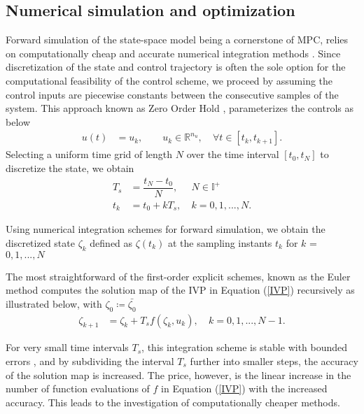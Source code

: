 \subsection{Numerical simulation and optimization}
Forward simulation of the state-space model being a cornerstone of \ac{MPC}, relies on computationally cheap and accurate numerical integration methods \cite[p. 7]{gros_numerical_2022}. Since discretization of the state and control trajectory is often the sole option for the computational feasibility of the control scheme, we proceed by assuming the control inputs are piecewise constants between the consecutive samples of the system. This approach known as Zero Order Hold \cite{gros_numerical_2022}, parameterizes the controls as below
\begin{align}
    u(t) &= u_{k}, \qquad u_{k} \in \mathbb{R}^{n_u},&~\forall t \in [t_{k}, t_{k+1}].\label{ZeroOrder}
\end{align}
Selecting a uniform time grid of length $N$ over the time interval $[t_{0}, t_{N}]$ to discretize the state, we obtain
\begin{align}
    T_s &= \dfrac{t_{N}-t_0}{N}, & ~ N \in \mathbb{I}^+\\
    t_k &= t_0 + kT_s, &  ~ k = 0, 1, ..., N.
\end{align}
\par Using numerical integration schemes for forward simulation, we obtain the discretized state $\zeta_{k}$ defined as $\zeta(t_{k})$ at the sampling instants $t_{k}$ for $k$ = $0, 1, ..., N$ 

\par The most straightforward of the first-order explicit schemes, known as the Euler method computes the solution map of the \ac{IVP} in Equation (\ref{IVP}) recursively as illustrated below, with $\zeta_{0} \coloneq \bar{\zeta_{0}}$
\begin{align}
\zeta_{k+1} &= \zeta_{k} + T_{s} f(\zeta_{k}, u_{k}), &  ~  k =  0, 1, ..., N - 1.
\end{align}
\par For very small time intervals $T_s$, this integration scheme is stable with bounded errors \cite[p. 12]{gros_numerical_2022}, and by subdividing the interval $T_s$ further 
into smaller steps, the accuracy of the solution map is increased. The price, however, is the linear increase in the number of function evaluations of $f$ in Equation (\ref{IVP}) with the increased accuracy. This leads to the investigation of computationally cheaper methods. 

